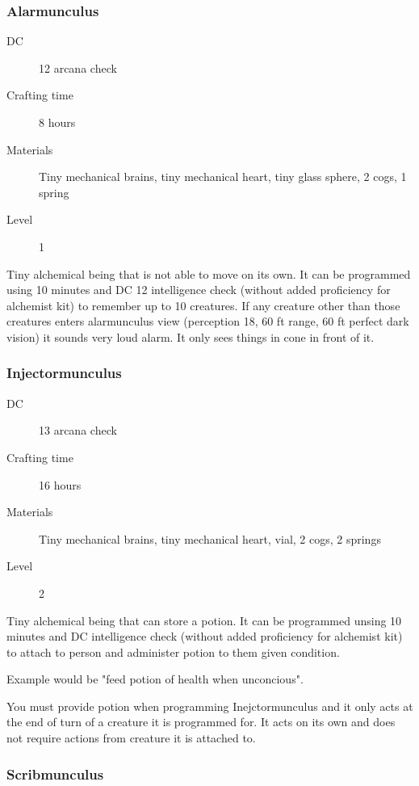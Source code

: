 \subsubsection{Alarmunculus}

\begin{description}
\item [DC] 12 arcana check
\item [Crafting time] 8 hours
\item [Materials] Tiny mechanical brains, tiny mechanical heart, tiny glass sphere, 2 cogs, 1 spring
\item [Level] 1
\end{description}

Tiny alchemical being that is not able to move on its own. It can be programmed using 10 minutes and DC 12 intelligence check (without added proficiency for alchemist kit) to remember up to 10 creatures. If any creature other than those creatures enters alarmunculus view (perception 18, 60 ft range, 60 ft perfect dark vision) it sounds very loud alarm. It only sees things in cone in front of it.

\subsubsection{Injectormunculus}

\begin{description}
\item [DC] 13 arcana check
\item [Crafting time] 16 hours
\item [Materials] Tiny mechanical brains, tiny mechanical heart, vial, 2 cogs, 2 springs
\item [Level] 2
\end{description}

Tiny alchemical being that can store a potion. It can be programmed unsing 10 minutes and DC intelligence check (without added proficiency for alchemist kit) to attach to person and administer potion to them given condition.

Example would be "feed potion of health when unconcious".

You must provide potion when programming Inejctormunculus and it only acts at the end of turn of a creature it is programmed for. It acts on its own and does not require actions from creature it is attached to.

\subsubsection{Scribmunculus}

